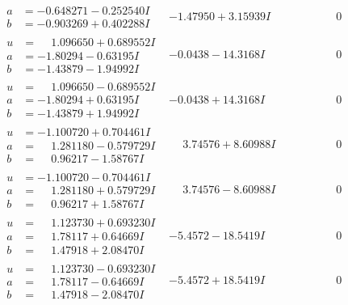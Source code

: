 \documentclass[1p]{elsarticle_modified}
\theoremstyle{definition}
\begin{document}
$$\begin{array}{c|c|c}
\begin{aligned}
a &= -0.648271 - 0.252540 I \\
b &= -0.903269 + 0.402288 I\end{aligned}
 & -1.47950 + 3.15939 I & \phantom{-0.000000 } 0 \\ \hline\begin{aligned}
u &= \phantom{-}1.096650 + 0.689552 I \\
a &= -1.80294 - 0.63195 I \\
b &= -1.43879 - 1.94992 I\end{aligned}
 & -0.0438 - 14.3168 I & \phantom{-0.000000 } 0 \\ \hline\begin{aligned}
u &= \phantom{-}1.096650 - 0.689552 I \\
a &= -1.80294 + 0.63195 I \\
b &= -1.43879 + 1.94992 I\end{aligned}
 & -0.0438 + 14.3168 I & \phantom{-0.000000 } 0 \\ \hline\begin{aligned}
u &= -1.100720 + 0.704461 I \\
a &= \phantom{-}1.281180 - 0.579729 I \\
b &= \phantom{-}0.96217 - 1.58767 I\end{aligned}
 & \phantom{-}3.74576 + 8.60988 I & \phantom{-0.000000 } 0 \\ \hline\begin{aligned}
u &= -1.100720 - 0.704461 I \\
a &= \phantom{-}1.281180 + 0.579729 I \\
b &= \phantom{-}0.96217 + 1.58767 I\end{aligned}
 & \phantom{-}3.74576 - 8.60988 I & \phantom{-0.000000 } 0 \\ \hline\begin{aligned}
u &= \phantom{-}1.123730 + 0.693230 I \\
a &= \phantom{-}1.78117 + 0.64669 I \\
b &= \phantom{-}1.47918 + 2.08470 I\end{aligned}
 & -5.4572 - 18.5419 I & \phantom{-0.000000 } 0 \\ \hline\begin{aligned}
u &= \phantom{-}1.123730 - 0.693230 I \\
a &= \phantom{-}1.78117 - 0.64669 I \\
b &= \phantom{-}1.47918 - 2.08470 I\end{aligned}
 & -5.4572 + 18.5419 I & \phantom{-0.000000 } 0 \\ \hline\begin{aligned}

\end{aligned}
\end{array}$$
\end{document}
